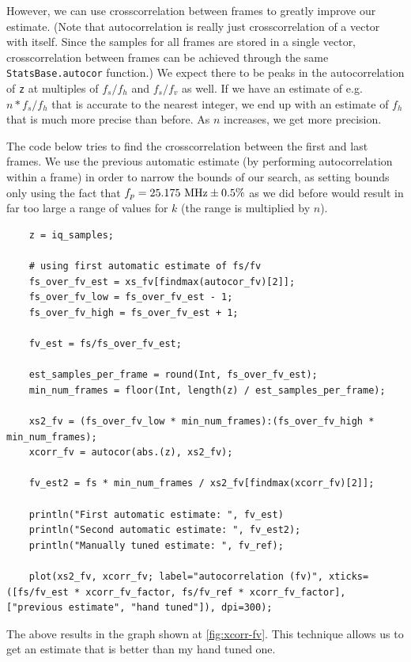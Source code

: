 \documentclass{article}
\newcommand*{\code}[1]{\texttt{#1}}
\begin{document}
However, we can use crosscorrelation between frames to greatly improve our estimate. (Note that autocorrelation is really just crosscorrelation of a vector with itself. Since the samples for all frames are stored in a single vector, crosscorrelation between frames can be achieved through the same \code{StatsBase.autocor} function.) We expect there to be peaks in the autocorrelation of \code{z} at multiples of $f_s / f_h$ and $f_s / f_v$ as well. If we have an estimate of e.g. $n * f_s / f_h$ that is accurate to the nearest integer, we end up with an estimate of $f_h$ that is much more precise than before. As $n$ increases, we get more precision.

The code below tries to find the crosscorrelation between the first and last frames. We use the previous automatic estimate (by performing autocorrelation within a frame) in order to narrow the bounds of our search, as setting bounds only using the fact that $f_p = \textnormal{25.175 MHz} \pm \textnormal{0.5\%}$ as we did before would result in far too large a range of values for $k$ (the range is multiplied by $n$).

\begin{verbatim}
    z = iq_samples;

    # using first automatic estimate of fs/fv
    fs_over_fv_est = xs_fv[findmax(autocor_fv)[2]];
    fs_over_fv_low = fs_over_fv_est - 1;
    fs_over_fv_high = fs_over_fv_est + 1;

    fv_est = fs/fs_over_fv_est;

    est_samples_per_frame = round(Int, fs_over_fv_est);
    min_num_frames = floor(Int, length(z) / est_samples_per_frame);

    xs2_fv = (fs_over_fv_low * min_num_frames):(fs_over_fv_high * min_num_frames);
    xcorr_fv = autocor(abs.(z), xs2_fv);

    fv_est2 = fs * min_num_frames / xs2_fv[findmax(xcorr_fv)[2]];

    println("First automatic estimate: ", fv_est)
    println("Second automatic estimate: ", fv_est2);
    println("Manually tuned estimate: ", fv_ref);

    plot(xs2_fv, xcorr_fv; label="autocorrelation (fv)", xticks=([fs/fv_est * xcorr_fv_factor, fs/fv_ref * xcorr_fv_factor], ["previous estimate", "hand tuned"]), dpi=300);
\end{verbatim}

The above results in the graph shown at \ref{fig:xcorr-fv}. This technique allows us to get an estimate that is better than my hand tuned one.
\end{document}
